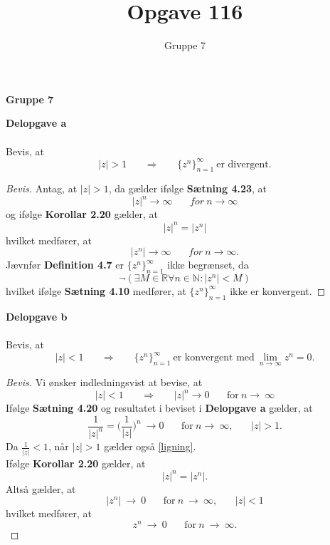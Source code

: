 \documentclass[12pt,a4paper,final]{report}
\author{Gruppe 7}
\title{Opgave 116}
\begin{document}
\begin{center}
\textbf{Gruppe 7}
\end{center}
\noindent \textbf{Delopgave a}\\\\
Bevis, at
\begin{equation}
|z|>1 \phantom{mm} \Rightarrow \phantom{mm}\{z^n\}_{n=1}^{\infty} \ \text{er divergent}.
\end{equation}
\begin{proof}[Bevis] \label{delopgave_a}
Antag, at $|z|>1$, da gælder ifølge \textbf{Sætning 4.23}, at
\begin{equation}
|z|^n \to \infty \phantom{mm} for \ n \to \infty
\end{equation}
og ifølge \textbf{Korollar 2.20} gælder, at
\begin{equation}
|z|^n=|z^n|
\end{equation}
hvilket medfører, at
\begin{equation}
|z^n| \to \infty \phantom{mm} for \ n \to \infty.
\end{equation}
Jævnfør \textbf{Definition 4.7} er $\{z^n\}_{n=1}^\infty$ ikke begrænset, da
\begin{equation}
\neg(\exists M \in \mathbb{R} \forall n \in \mathbb{N}: |z^n|<M)
\end{equation}
hvilket ifølge \textbf{Sætning 4.10} medfører, at $\{z^n\}_{n=1}^{\infty}$ ikke er konvergent.
\end{proof}

\noindent \textbf{Delopgave b}\\\\
Bevis, at
\begin{equation}
|z|<1 \phantom{mm} \Rightarrow \phantom{mm} \{z^n\}_{n=1}^{\infty} \ \text{er konvergent med} \ \lim_{n \to \infty}z^n=0.
\end{equation}
\begin{proof}[Bevis]
Vi ønsker indledningsvist at bevise, at
\begin{equation}\label{ligning}
|z|<1 \phantom{mm} \Rightarrow \phantom{mm} |z|^n \to 0 \phantom{mm} \text{for} \ n \to \ \infty
\end{equation}
Ifølge \textbf{Sætning 4.20} og resultatet i beviset i \textbf{Delopgave a} gælder, at
\begin{equation}
\frac{1}{|z|^n}=\bigg(\frac{1}{|z|}\bigg)^n \ \to 0 \phantom{mm} \text{for} \ n \to \ \infty, \phantom{mm} |z|>1.
\end{equation}
Da $\frac{1}{|z|} < 1$, når $|z|>1$ gælder også \eqref{ligning}.\\
Ifølge \textbf{Korollar 2.20} gælder, at
\begin{equation}
|z|^n=|z^n|.
\end{equation}
Altså gælder, at
\begin{equation}
|z^n| \ \to \ 0 \phantom{mm} \text{for} \ n \ \to \ \infty, \phantom{mm} |z|<1
\end{equation}
hvilket medfører, at
\begin{equation}
z^n \ \to \ 0 \phantom{mm} \text{for} \ n \ \to \ \infty.
\end{equation}
\end{proof}
\end{document}
